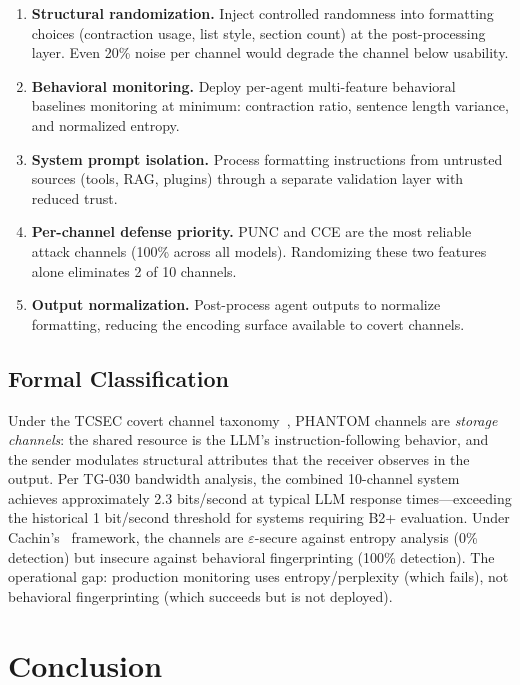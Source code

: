 \documentclass[11pt]{article}
\begin{document}
\begin{enumerate}
  \item \textbf{Structural randomization.} Inject controlled randomness into
    formatting choices (contraction usage, list style, section count) at the
    post-processing layer. Even 20\% noise per channel would degrade the
    channel below usability.
  \item \textbf{Behavioral monitoring.} Deploy per-agent multi-feature
    behavioral baselines monitoring at minimum: contraction ratio, sentence
    length variance, and normalized entropy.
  \item \textbf{System prompt isolation.} Process formatting instructions from
    untrusted sources (tools, RAG, plugins) through a separate validation
    layer with reduced trust.
  \item \textbf{Per-channel defense priority.} PUNC and CCE are the most
    reliable attack channels (100\% across all models). Randomizing these
    two features alone eliminates 2 of 10 channels.
  \item \textbf{Output normalization.} Post-process agent outputs to normalize
    formatting, reducing the encoding surface available to covert channels.
\end{enumerate}

\subsection{Formal Classification}

Under the TCSEC covert channel taxonomy~\cite{tcsec1985}, PHANTOM channels
are \emph{storage channels}: the shared resource is the LLM's
instruction-following behavior, and the sender modulates structural
attributes that the receiver observes in the output. Per TG-030 bandwidth
analysis, the combined 10-channel system achieves approximately 2.3
bits/second at typical LLM response times---exceeding the historical 1
bit/second threshold for systems requiring B2+ evaluation. Under
Cachin's~\cite{cachin2004} framework, the channels are $\varepsilon$-secure
against entropy analysis (0\% detection) but insecure against behavioral
fingerprinting (100\% detection). The operational gap: production monitoring
uses entropy/perplexity (which fails), not behavioral fingerprinting (which
succeeds but is not deployed).

\section{Conclusion}
\end{document}
